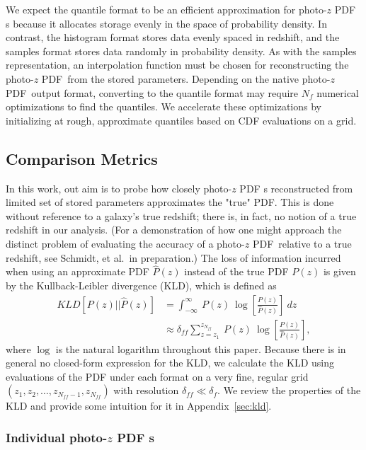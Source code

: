 \documentclass[\docopts]{\docclass}
\newcommand{\pz}{photo-$z$ PDF\xspace}
\begin{document}
We expect the quantile format to be an efficient approximation for \pz s 
because it allocates storage evenly in the space of probability density.
In contrast, the histogram format stores data evenly spaced in redshift, and 
the samples format stores data randomly in probability density.
As with the samples representation, an interpolation function must be chosen 
for reconstructing the \pz\ from the stored parameters.
Depending on the native \pz\ output format, converting to the quantile format 
may require $N_{f}$ numerical optimizations to find the quantiles.
We accelerate these optimizations by initializing at rough, approximate 
quantiles based on CDF evaluations on a grid.





\subsection{Comparison Metrics}
\label{sec:metric}

In this work, out aim is to probe how closely \pz s reconstructed from limited 
set of stored parameters approximates the "true" PDF.
This is done without reference to a galaxy's true redshift; there is, in fact, 
no notion of a true redshift in our analysis.
(For a demonstration of how one might approach the distinct problem of 
evaluating the accuracy of a \pz\ relative to a true redshift, see Schmidt, et 
al.\ in preparation.)
The loss of information incurred when using an approximate PDF $\hat{P}(z)$ 
instead of the true PDF $P(z)$ is given by the Kullback-Leibler divergence 
(KLD), which is defined as
\begin{align}
  \label{eq:kld}
  KLD[P(z) || \hat{P}(z)] &= \int_{-\infty}^{\infty}\ P(z)\ 
\log\left[\frac{P(z)}{\hat{P}(z)}\right]\ dz\\
  &\approx \delta_{ff}\sum_{z=z_{1}}^{z_{N_{ff}}}\ P(z)\ 
\log\left[\frac{P(z)}{\hat{P}(z)}\right],
\end{align}
where $\log$ is the natural logarithm throughout this paper.
Because there is in general no closed-form expression for the KLD, we calculate 
the KLD using evaluations of the PDF under each format on a very fine, regular 
grid $(z_{1}, z_{2}, \dots, z_{N_{ff}-1}, z_{N_{ff}})$ with resolution 
$\delta_{ff}\ll\delta_{f}$.
We review the properties of the KLD and provide some intuition for it in 
Appendix~\ref{sec:kld}.

\subsubsection{Individual \pz s}
\label{sec:individual_metric}
\end{document}
